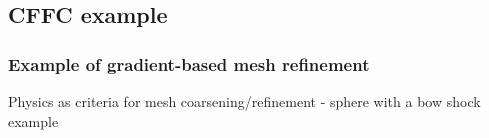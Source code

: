 \documentclass{beamer}
\begin{document}
\subsection[example]{CFFC example}
\begin{frame}
\frametitle{Example of gradient-based mesh refinement}
\scriptsize
\begin{minipage}[t][1\textheight]{1\textwidth}
\vspace{-10pt}
\begin{exampleblock}{Physics as criteria for mesh coarsening/refinement - sphere with a bow shock example}
\vspace{-20pt}
\begin{figure}
\label{fig:Gradientbased}
\centering
{}

\end{figure}
\end{exampleblock}
\end{minipage}
\end{frame}
\end{document}
